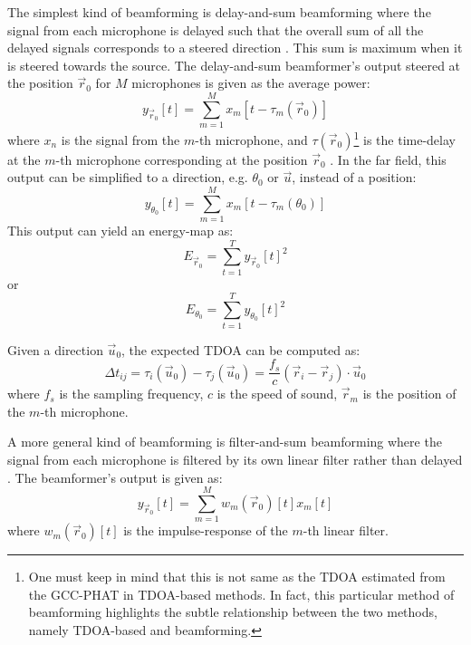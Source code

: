 \documentclass[notitlepage]{report}
\begin{document}
The simplest kind of beamforming is delay-and-sum beamforming where the signal from each microphone is delayed such that the overall sum of all the delayed signals corresponds to a steered direction \cite{rascon_localization_2017}. This sum is maximum when it is steered towards the source. The delay-and-sum beamformer's output steered at the position $\vec{r}_0$ for $M$ microphones is given as the average power:
\begin{equation}
y_{\vec{r}_0}[t] = \sum_{m=1}^M x_m[t-\tau_m(\vec{r}_0)] 
\end{equation}
where $x_n$ is the signal from the $m$-th microphone, and $\tau(\vec{r}_0)$\footnote{One must keep in mind that this is not same as the TDOA estimated from the GCC-PHAT in TDOA-based methods. In fact, this particular method of beamforming highlights the subtle relationship between the two methods, namely TDOA-based and beamforming.} is the time-delay at the $m$-th microphone corresponding at the position $\vec{r}_0$ \cite{argentieri_survey_2015}. In the far field, this output can be simplified to a direction, e.g. $\theta_0$ or $\vec{u}$, instead of a position:
\begin{equation}
y_{\theta_0}[t] = \sum_{m=1}^M x_m[t-\tau_m(\theta_0)] 
\end{equation}
This output can yield an energy-map as:
\begin{equation}
E_{\vec{r}_0} = \sum_{t=1}^T y_{\vec{r}_0}[t]^2
\end{equation}
or
\begin{equation}
E_{\theta_0} = \sum_{t=1}^T y_{\theta_0}[t]^2
\end{equation}

Given a direction $\vec{u}_0$, the expected TDOA can be computed as:
\begin{equation}
\Delta t_{ij} = \tau_{i}(\vec{u}_0) - \tau_{j}(\vec{u}_0) = \frac{f_s}{c} \left( \vec{r}_i - \vec{r}_j \right) \cdot \vec{u}_0
\end{equation}
where $f_s$ is the sampling frequency, $c$ is the speed of sound, $\vec{r}_m$ is the position of the $m$-th microphone. 

A more general kind of beamforming is filter-and-sum beamforming where the signal from each microphone is filtered by its own linear filter rather than delayed \cite{argentieri_survey_2015}. The beamformer's output is given as:
\begin{equation}
y_{\vec{r}_0}[t] = \sum_{m=1}^M w_m(\vec{r}_0)[t]x_m[t]
\end{equation} 
where $w_m(\vec{r}_0)[t]$ is the impulse-response of the $m$-th linear filter.
\end{document}
